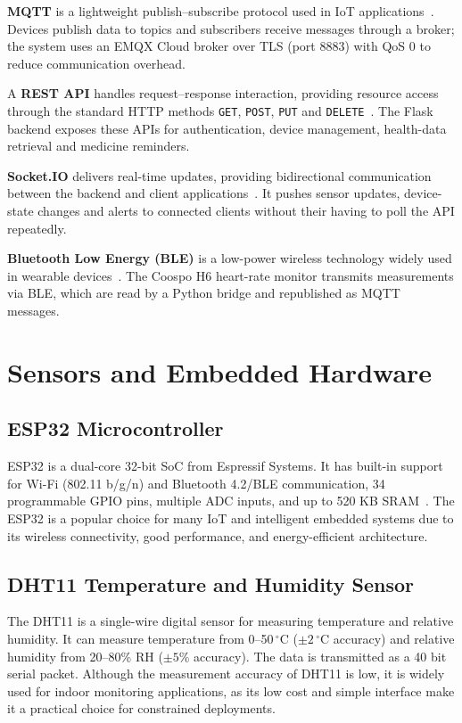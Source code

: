 \textbf{MQTT} is a lightweight publish--subscribe protocol used in IoT applications~\cite{Banks2019}. Devices publish data to topics and subscribers receive messages through a broker; the system uses an EMQX Cloud broker over TLS (port 8883) with QoS 0 to reduce communication overhead.

A \textbf{REST API} handles request--response interaction, providing resource access through the standard HTTP methods \texttt{GET}, \texttt{POST}, \texttt{PUT} and \texttt{DELETE}~\cite{Fielding2000}. The Flask backend exposes these APIs for authentication, device management, health-data retrieval and medicine reminders.

\textbf{Socket.IO} delivers real-time updates, providing bidirectional communication between the backend and client applications~\cite{SocketIO2019}. It pushes sensor updates, device-state changes and alerts to connected clients without their having to poll the API repeatedly.

\textbf{Bluetooth Low Energy (BLE)} is a low-power wireless technology widely used in wearable devices~\cite{BluetoothSIG2011}. The Coospo H6 heart-rate monitor transmits measurements via BLE, which are read by a Python bridge and republished as MQTT messages.

\section{Sensors and Embedded Hardware}

\subsection{ESP32 Microcontroller}

ESP32 is a dual-core 32-bit SoC from Espressif Systems. It has built-in support for Wi-Fi (802.11 b/g/n) and Bluetooth 4.2/BLE communication, 34 programmable GPIO pins, multiple ADC inputs, and up to 520 KB SRAM~\cite{Espressif2023}. The ESP32 is a popular choice for many IoT and intelligent embedded systems due to its wireless connectivity, good performance, and energy-efficient architecture.

\subsection{DHT11 Temperature and Humidity Sensor}

The DHT11 is a single-wire digital sensor for measuring temperature and relative humidity. It can measure temperature from 0--50\,$^\circ$C ($\pm2\,^\circ$C accuracy) and relative humidity from 20--80\% RH ($\pm5$\% accuracy). The data is transmitted as a 40 bit serial packet. Although the measurement accuracy of DHT11 is low, it is widely used for indoor monitoring applications, as its low cost and simple interface make it a practical choice for constrained deployments.

